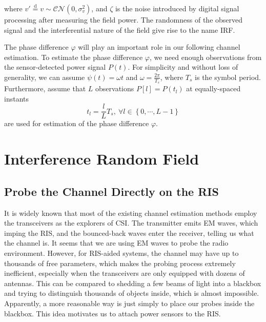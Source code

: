 \documentclass[12pt,draftclsnofoot,journal,onecolumn]{IEEEtran}
\theoremstyle{nonumberplain}
\begin{document}
    where $v'\overset{\text{d}}{=}v\sim\mathcal{CN}\left(0,\sigma_{v}^{2}\right)$, and $\zeta$ is the noise introduced by digital signal processing after measuring the field power. The randomness of the observed signal and the interferential nature of the field give rise to the name \ac{IRF}. 

    The phase difference $\varphi$ will play an important role in our following channel estimation. To estimate the phase difference $\varphi$, we need enough observations from the sensor-detected power signal $P(t)$. For simplicity and without loss of generality, we can assume $\psi(t)=\omega t$ and $\omega=\frac{2\pi}{T_{s}}$, where $T_s$ is the symbol period. Furthermore, assume that $L$ observations $P[l]=P(t_{l})$ at equally-spaced instants 
    \begin{equation}
        \label{observation time}
        t_{l}=\frac{l}{L}T_{s},~\forall l\in \left\{0,\cdots ,L-1\right\}
    \end{equation}
    are used for estimation of the phase difference $\varphi$.

\section{Interference Random Field}
\label{Interference Random Field}
\subsection{Probe the Channel Directly on the RIS}
    It is widely known that most of the existing channel estimation methods employ the transceivers as the explorers of CSI. The transmitter emits EM waves, which imping the RIS, and the bounced-back waves enter the receiver, telling us what the channel is. It seems that we are using EM waves to probe the radio environment. However, for RIS-aided systems, the channel may have up to thousands of free parameters, which makes the probing process extremely inefficient, especially when the transceivers are only equipped with dozens of antennas. This can be compared to shedding a few beams of light into a blackbox and trying to distinguish thousands of objects inside, which is almost impossible. Apparently, a more reasonable way is just simply to place our probes inside the blackbox. This idea motivates us to attach power sensors to the RIS. 
\end{document}
